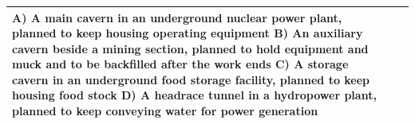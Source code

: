 \begin{table}[t]
\begin{tabular}{@{}p{}p{}p{}@{}}
\newline A) A main cavern in an underground nuclear power plant, planned to keep housing operating equipment
\newline B) An auxiliary cavern beside a mining section, planned to hold equipment and muck and to be backfilled after the work ends
\newline C) A storage cavern in an underground food storage facility, planned to keep housing food stock
\newline D) A headrace tunnel in a hydropower plant, planned to keep conveying water for power generation \\
\bottomrule
\end{tabular}
\end{table}
